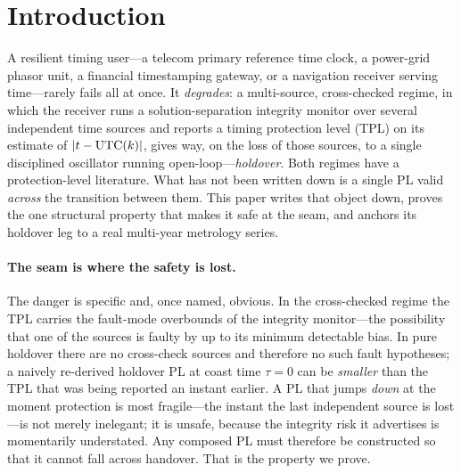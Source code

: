 \section{Introduction}
\label{sec:intro}

A resilient timing user---a telecom primary reference time clock, a power-grid
phasor unit, a financial timestamping gateway, or a navigation receiver serving
time---rarely fails all at once. It \emph{degrades}: a multi-source, cross-checked
regime, in which the receiver runs a solution-separation integrity monitor over
several independent time sources and reports a timing protection level (TPL) on
its estimate of $|t-\mathrm{UTC}(k){}|$, gives way, on the loss of those sources, to a
single disciplined oscillator running open-loop---\emph{holdover}. Both regimes
have a protection-level literature. What has not been written down is a single PL
valid \emph{across} the transition between them. This paper writes that object
down, proves the one structural property that makes it safe at the seam, and
anchors its holdover leg to a real multi-year metrology series.

\paragraph{The seam is where the safety is lost.}
The danger is specific and, once named, obvious. In the cross-checked regime the
TPL carries the fault-mode overbounds of the integrity monitor---the possibility
that one of the sources is faulty by up to its minimum detectable bias. In pure
holdover there are no cross-check sources and therefore no such fault hypotheses;
a naively re-derived holdover PL at coast time $\tau=0$ can be \emph{smaller} than
the TPL that was being reported an instant earlier. A PL that jumps \emph{down} at
the moment protection is most fragile---the instant the last independent source is
lost---is not merely inelegant; it is unsafe, because the integrity risk it
advertises is momentarily understated. Any composed PL must therefore be
constructed so that it cannot fall across handover. That is the property we prove.


